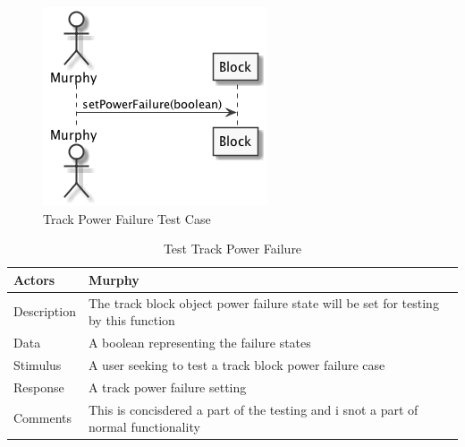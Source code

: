 \documentclass[]{article}
\begin{document}
\begin{figure}[H]
	\centering
	\includegraphics[scale=.5]{setPowerFailure.png}
	\caption{Track Power Failure Test Case}
\end{figure}
\begin{table}[H]
	\centering
	\caption{Test Track Power Failure}
	\begin{tabular}{|l|l|}
		\hline
		Actors & \parbox[t]{10cm}{Murphy} \\ \hline
		Description & \parbox[t]{10cm}{The track block object power failure state will be set for testing by this function} \\ \hline
		Data &  \parbox[t]{10cm}{A boolean representing the failure states} \\ \hline
		Stimulus &  \parbox[t]{10cm}{A user seeking to test a track block power failure case} \\ \hline
		Response & \parbox[t]{10cm}{A track power failure setting}\\ \hline
		Comments & \parbox[t]{10cm}{This is concisdered a part of the testing and i snot a part of normal functionality}  \\ \hline
	\end{tabular}
\end{table}
\end{document}
